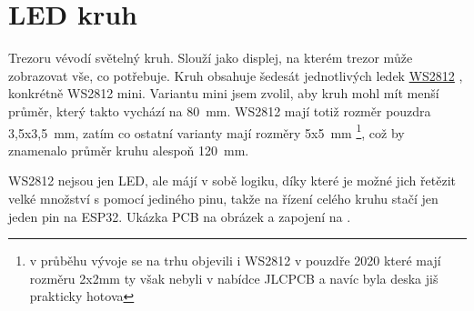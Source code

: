 \section{LED kruh}
\label{WS2812}

Trezoru vévodí světelný kruh. Slouží jako displej, na kterém trezor může zobrazovat vše, co potřebuje. Kruh obsahuje šedesát jednotlivých ledek 
\href{https://cdn-shop.adafruit.com/datasheets/WS2812B.pdf}{WS2812} \parencite{ws2812}, konkrétně WS2812 mini. Variantu mini jsem zvolil, aby kruh mohl mít menší
průměr, který takto vychází na 80~mm. WS2812 mají totiž rozměr pouzdra 3,5x3,5~mm, zatím co ostatní varianty mají rozměry 5x5~mm \footnote{v průběhu vývoje se na trhu 
objevili i WS2812 v pouzdře 2020 které mají rozměru 2x2mm ty však nebyli v nabídce JLCPCB a navíc byla deska jiš prakticky hotova}, což by znamenalo průměr kruhu alespoň 120~mm.

WS2812 nejsou jen LED, ale májí v sobě logiku, díky které je možné jich řetězit velké množství s pomocí jediného pinu, takže na řízení celého kruhu stačí jen jeden pin na ESP32.\newline
Ukázka PCB na obrázek  a zapojení na .

\newpage
